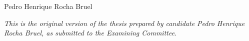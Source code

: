 {\begin{titlepage}
\begin{center}
    \vspace{0.7cm}

    {\Large
      Pedro Henrique Rocha Bruel
    }

    \vspace{4cm}

    \hfill
    \begin{minipage}{0.5\textwidth}
      {\large\it
        This is the original version of the thesis prepared by candidate Pedro
        Henrique Rocha Bruel, as submitted to the Examining Committee.
      }
    \end{minipage}

    \clearpage{\pagestyle{empty}\cleardoublepage}
  \end{center}
  \restoregeometry
\end{titlepage}%
}
